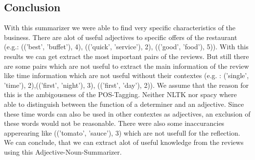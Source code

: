 	\subsection{Conclusion}
	With this summarizer we were able to find very specific characteristics of the business. There are alot of useful adjectives to specific offers of the restaurant (e.g.: (('best', 'buffet'), 4), (('quick', 'service'), 2), (('good', 'food'), 5)). With this results we can get extract the most important pairs of the reviews. But still there are some pairs which are not useful to extract the main information of the review like time information which are not useful without their contextes (e.g. : ('single', 'time'), 2),(('first', 'night'), 3), (('first', 'day'), 2)). We assume that the reason for this is the ambigousness of 
	the POS-Tagging. Neither NLTK nor spacy where able to distinguish between the function of a determiner and an adjective. Since these time words can also be used in other contextes as adjectives, an exclusion of these words would not be reasonable. There were also some inaccurancies apperearing like  (('tomato', 'sauce'), 3) which are not usefull for the reflection.
	We can conclude, that we can extract alot of useful knowledge from the reviews using this Adjective-Noun-Summarizer. 
	
